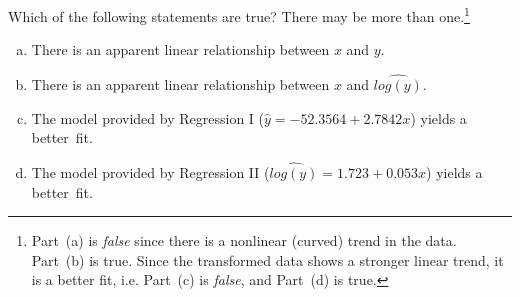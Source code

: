 \begin{exercise}Which of the following statements are true?  There may be more than one.\footnote{Part~(a) is \emph{false} since there is a nonlinear (curved) trend in the data. Part~(b) is true. Since the transformed data shows a stronger linear trend, it is a better fit, i.e. Part~(c) is \emph{false}, and Part~(d) is true.}
\begin{enumerate}[(a)]
\item There is an apparent linear relationship between $x$ and $y$.
\item There is an apparent linear relationship between $x$ and $\widehat{log(y)}$.
\item The model provided by Regression I ($\hat{y} = -52.3564 + 2.7842 x$) yields a better~fit.
\item The model provided by Regression II ($\widehat{log(y)} = 1.723 +0.053 x$) yields a better~fit.
\end{enumerate}
\end{exercise}
